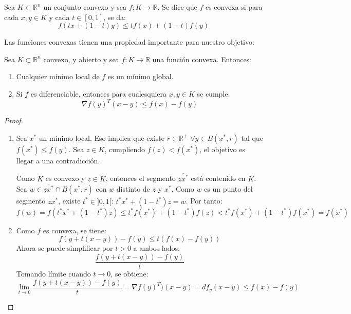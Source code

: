 \begin{definition}\label{prop:convexa}
    Sea $K\subset \mathbb{R}^n$ un conjunto convexo y sea $f: K \rightarrow \mathbb{R}$. Se dice que $f$ es convexa si para cada $x,y\in K$ y cada $t \in [0,1]$, se da:
    \[
        f(tx+(1-t)y) \leq tf(x)+(1-t)f(y)
    \]
\end{definition}

Las funciones convexas tienen una propiedad importante para nuestro objetivo:

\begin{proposition}\label{prop:convexo}
    Sea $K\subset \mathbb{R}^n$ convexo, y abierto y sea $f: K \rightarrow \mathbb{R}$ una función convexa. Entonces:
    \begin{enumerate}
        \item Cualquier mínimo local de $f$ es un mínimo global.
        \item Si $f$ es diferenciable, entonces para cualesquiera $x,y\in K$ se cumple:
        \begin{equation}\label{random:2}
            \nabla f(y)^T(x-y) \leq f(x) - f(y)
        \end{equation}
    \end{enumerate}
\end{proposition}

\begin{proof}$ $
    \begin{enumerate}
        \item Sea $x^*$ un mínimo local. Eso implica que existe $r\in\mathbb{R}^+$ $\forall y \in B(x^*, r)$ tal que $f(x^*)\leq f(y)$. Sea $z\in K$, cumpliendo $f(z)<f(x^*)$, el objetivo
        es llegar a una contradicción.

        Como $K$ es convexo y $z\in K$, entonces el segmento $\overline{zx^*}$ está contenido en $K$. Sea $w\in \overline{zx^*}\cap B(x^*, r)$ con $w$ distinto de $z$ y $x^*$. Como $w$ es un punto
        del segmento $\overline{zx^*}$, existe $t^*\in ]0,1[$: $t^*x^*+(1-t^*)z=w$. Por tanto:
        \[
            f(w) = f(t^*x^*+(1-t^*)z)\leq t^*f(x^*)+(1-t^*)f(z) < t^*f(x^*) + (1-t^*)f(x^*) = f(x^*)
        \]
        \item Como $f$ es convexa, se tiene:
        \[
            f(y+t(x-y))-f(y) \leq t(f(x)-f(y))
        \]
        Ahora se puede simplificar por $t>0$ a ambos lados:
        \[
            \frac{f(y+t(x-y))-f(y)}{t}
        \]
        Tomando límite cuando $t \longrightarrow 0$, se obtiene:
        \[
            \lim_{t\longrightarrow 0 } \frac{f(y+t(x-y))-f(y)}{t} = \nabla f(y)^T)(x-y)=df_y(x-y) \leq f(x)-f(y)
        \]
    \end{enumerate}
\end{proof}


